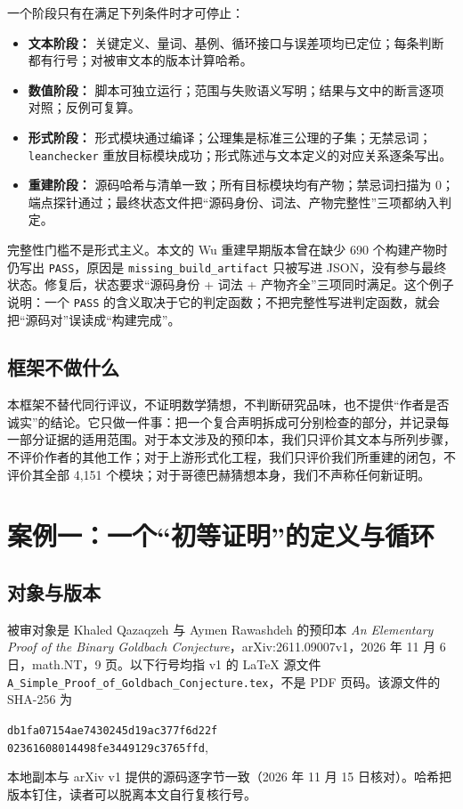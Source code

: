 \documentclass[11pt,a4paper]{ctexart}
\theoremstyle{plain}
\theoremstyle{definition}
\begin{document}
一个阶段只有在满足下列条件时才可停止：

\begin{itemize}
\item \textbf{文本阶段：} 关键定义、量词、基例、循环接口与误差项均已定位；每条判断都有行号；对被审文本的版本计算哈希。
\item \textbf{数值阶段：} 脚本可独立运行；范围与失败语义写明；结果与文中的断言逐项对照；反例可复算。
\item \textbf{形式阶段：} 形式模块通过编译；公理集是标准三公理的子集；无禁忌词；\texttt{leanchecker} 重放目标模块成功；形式陈述与文本定义的对应关系逐条写出。
\item \textbf{重建阶段：} 源码哈希与清单一致；所有目标模块均有产物；禁忌词扫描为 0；端点探针通过；最终状态文件把“源码身份、词法、产物完整性”三项都纳入判定。
\end{itemize}

完整性门槛不是形式主义。本文的 Wu 重建早期版本曾在缺少 690 个构建产物时仍写出 \texttt{PASS}，原因是 \texttt{missing\_build\_artifact} 只被写进 JSON，没有参与最终状态。修复后，状态要求“源码身份 + 词法 + 产物齐全”三项同时满足。这个例子说明：一个 \texttt{PASS} 的含义取决于它的判定函数；不把完整性写进判定函数，就会把“源码对”误读成“构建完成”。

\subsection{框架不做什么}
\label{sec:not-do}

本框架不替代同行评议，不证明数学猜想，不判断研究品味，也不提供“作者是否诚实”的结论。它只做一件事：把一个复合声明拆成可分别检查的部分，并记录每一部分证据的适用范围。对于本文涉及的预印本，我们只评价其文本与所列步骤，不评价作者的其他工作；对于上游形式化工程，我们只评价我们所重建的闭包，不评价其全部 4,151 个模块；对于哥德巴赫猜想本身，我们不声称任何新证明。

\section{案例一：一个“初等证明”的定义与循环}
\label{sec:paper}

\subsection{对象与版本}
\label{sec:paper-object}

被审对象是 Khaled Qazaqzeh 与 Aymen Rawashdeh 的预印本 \emph{An Elementary Proof of the Binary Goldbach Conjecture}，arXiv:2611.09007v1，2026 年 11 月 6 日，math.NT，9 页\cite{qazaqzeh}。以下行号均指 v1 的 LaTeX 源文件 \texttt{A\_Simple\_Proof\_of\_Goldbach\_Conjecture.tex}，不是 PDF 页码。该源文件的 SHA-256 为
\begin{center}
\texttt{db1fa07154ae7430245d19ac377f6d22f\\02361608014498fe3449129c3765ffd},
\end{center}
本地副本与 arXiv v1 提供的源码逐字节一致（2026 年 11 月 15 日核对）。哈希把版本钉住，读者可以脱离本文自行复核行号。
\end{document}
